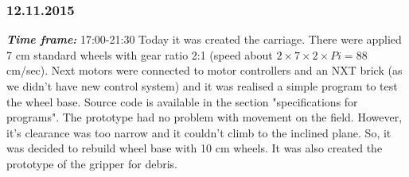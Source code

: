 \subsubsection{12.11.2015}
\textit{\textbf{Time frame:}} 17:00-21:30 \newline
Today it was created the carriage. There were applied 7 cm standard wheels with gear ratio 2:1 (speed about $2 \times 7 \times 2 \times Pi = 88$cm/sec). Next motors were connected to motor controllers and an NXT brick (as we didn't have new control system) and it was realised a simple program to test the wheel base. Source code is available in the section "specifications for programs".
The prototype had no problem with movement on the field. However, it's clearance was too narrow and it couldn't climb to the inclined plane. So, it was decided to rebuild wheel base with 10 cm wheels.
It was also created the prototype of the gripper for debris.

